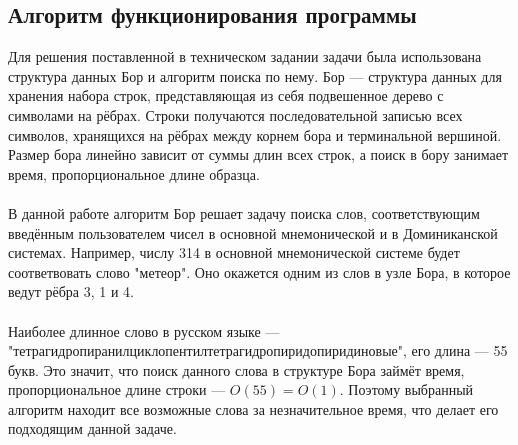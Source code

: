 \documentclass[draft]{article}
\begin{document}
\subsection{Алгоритм функционирования программы}
Для решения поставленной в техническом задании задачи была использована структура данных Бор\cite{litlink5} и алгоритм поиска по нему. Бор — структура данных для хранения набора строк, представляющая из себя подвешенное дерево с символами на рёбрах. Строки получаются последовательной записью всех символов, хранящихся на рёбрах между корнем бора и терминальной вершиной. Размер бора линейно зависит от суммы длин всех строк, а поиск в бору занимает время, пропорциональное длине образца.\\
~\\
В данной работе алгоритм Бор решает задачу поиска слов, соответствующим введённым пользователем чисел в основной мнемонической и в Доминиканской системах. Например, числу 314 в основной мнемонической системе будет соответвовать слово "{}метеор"{}. Оно окажется одним из слов в узле Бора, в которое ведут рёбра 3, 1 и 4.\\
~\\
Наиболее длинное слово в русском языке — "{}тетрагидропиранилциклопентилтетрагидропиридопиридиновые"{}, его длина — 55 букв\cite{litlink6}. Это значит, что поиск данного слова в структуре Бора займёт время, пропорциональное длине строки — $O(55)=O(1)$. Поэтому выбранный алгоритм находит все возможные слова за незначительное время, что делает его подходящим данной задаче.
\end{document}
